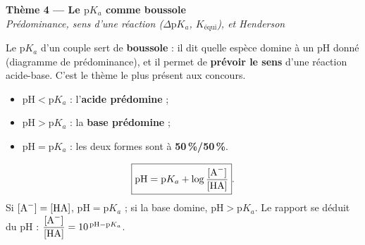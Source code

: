 \documentclass[11pt,a4paper]{article}
\begin{document}

\begin{center}
{\LARGE\bfseries\color{primarydark} Thème 4 — Le $\mathrm{p}K_a$ comme boussole}\\[2pt]
{\color{primary}\itshape Prédominance, sens d'une réaction ($\Delta \mathrm{p}K_a$, $K_{\text{équi}}$), et Henderson}
\end{center}

\medskip
Le $\mathrm{p}K_a$ d'un couple sert de \textbf{boussole} : il dit quelle espèce domine à un pH donné (diagramme
de prédominance), et il permet de \textbf{prévoir le sens} d'une réaction acide-base. C'est le thème le plus
présent aux concours.

\begin{cle}
\begin{itemize}[leftmargin=1.5em,topsep=2pt,itemsep=1.5pt]
  \item $\mathrm{pH} < \mathrm{p}K_a$ : l'\textbf{acide  prédomine} ;
  \item $\mathrm{pH} > \mathrm{p}K_a$ : la \textbf{base  prédomine} ;
  \item $\mathrm{pH} = \mathrm{p}K_a$ : les deux formes sont à \textbf{50\,\%/50\,\%}.
\end{itemize}
\end{cle}

\begin{center}
\end{center}

\begin{cle}
\[ \boxed{\mathrm{pH} = \mathrm{p}K_a + \log\frac{[\ce{A-}]}{[\ce{HA}]}}. \]
Si $[\ce{A-}]=[\ce{HA}]$, $\mathrm{pH}=\mathrm{p}K_a$ ; si la base domine, $\mathrm{pH}>\mathrm{p}K_a$. Le rapport
se déduit du pH : $\dfrac{[\ce{A-}]}{[\ce{HA}]} = 10^{\,\mathrm{pH}-\mathrm{p}K_a}$.
\end{cle}
\end{document}
